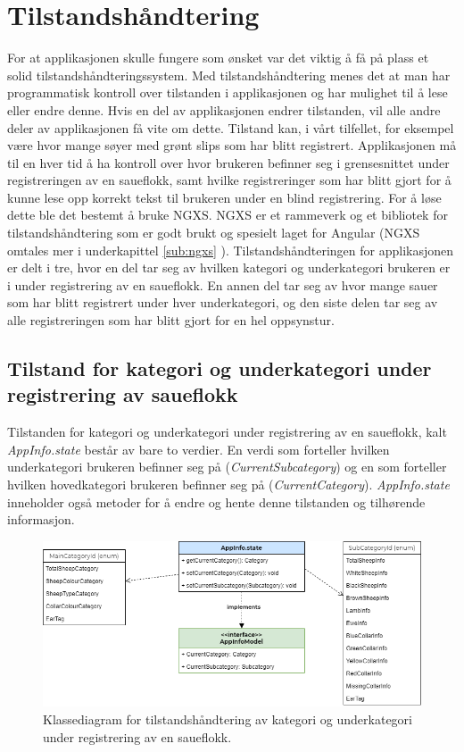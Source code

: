 \section{Tilstandshåndtering} \label{sec:tilstandshandtering}
For at applikasjonen skulle fungere som ønsket var det viktig å få på plass et solid tilstandshåndteringssystem. Med tilstandshåndtering menes det at man har programmatisk kontroll over tilstanden i applikasjonen og har mulighet til å lese eller endre denne. Hvis en del av applikasjonen endrer tilstanden, vil alle andre deler av applikasjonen få vite om dette. Tilstand kan, i vårt tilfellet, for eksempel være hvor mange søyer med grønt slips som har blitt registrert. Applikasjonen må til en hver tid å ha kontroll over hvor brukeren befinner seg i grensesnittet under registreringen av en saueflokk, samt hvilke registreringer som har blitt gjort for å kunne lese opp korrekt tekst til brukeren under en blind registrering. For å løse dette ble det bestemt å bruke NGXS. NGXS er et rammeverk og et bibliotek for tilstandshåndtering som er godt brukt og spesielt laget for Angular (NGXS omtales mer i underkapittel \ref{sub:ngxs} ). Tilstandshåndteringen for applikasjonen er delt i tre, hvor en del tar seg av hvilken kategori og underkategori brukeren er i under registrering av en saueflokk. En annen del tar seg av hvor mange sauer som har blitt registrert under hver underkategori, og den siste delen tar seg av alle registreringen som har blitt gjort for en hel oppsynstur.

\subsection{Tilstand for kategori og underkategori under registrering av saueflokk}
Tilstanden for kategori og underkategori under registrering av en saueflokk, kalt \textit{AppInfo.state} består av bare to verdier. En verdi som forteller hvilken underkategori brukeren befinner seg på (\textit{CurrentSubcategory}) og en som forteller hvilken hovedkategori brukeren befinner seg på (\textit{CurrentCategory}). \textit{AppInfo.state} inneholder også metoder for å endre og hente denne tilstanden og tilhørende informasjon.
\begin{figure}[H]
\centering
\captionsetup{width=.8\linewidth}
\includegraphics[scale=0.65]{Figurer/diagram/tilstand_registrering.png}
\caption{Klassediagram for tilstandshåndtering av kategori og underkategori under registrering av en saueflokk.}
\label{fig:tilstand_registrering}
\end{figure}

